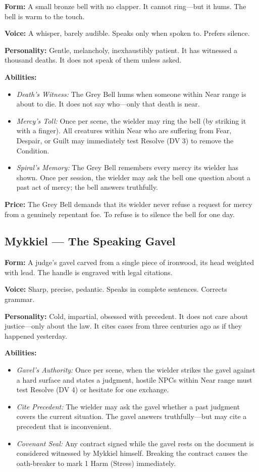 \noindent\textbf{Form:} A small bronze bell with no clapper. It cannot ring—but it hums. The bell is warm to the touch.

\noindent\textbf{Voice:} A whisper, barely audible. Speaks only when spoken to. Prefers silence.

\noindent\textbf{Personality:} Gentle, melancholy, inexhaustibly patient. It has witnessed a thousand deaths. It does not speak of them unless asked.

\noindent\textbf{Abilities:}
\begin{itemize}
\item \textit{Death's Witness:} The Grey Bell hums when someone within Near range is about to die. It does not say who—only that death is near.
\item \textit{Mercy's Toll:} Once per scene, the wielder may ring the bell (by striking it with a finger). All creatures within Near who are suffering from Fear, Despair, or Guilt may immediately test Resolve (DV 3) to remove the Condition.
\item \textit{Spiral's Memory:} The Grey Bell remembers every mercy its wielder has shown. Once per session, the wielder may ask the bell one question about a past act of mercy; the bell answers truthfully.
\end{itemize}

\noindent\textbf{Price:} The Grey Bell demands that its wielder never refuse a request for mercy from a genuinely repentant foe. To refuse is to silence the bell for one day.

\subsection{Mykkiel — The Speaking Gavel}

\noindent\textbf{Form:} A judge's gavel carved from a single piece of ironwood, its head weighted with lead. The handle is engraved with legal citations.

\noindent\textbf{Voice:} Sharp, precise, pedantic. Speaks in complete sentences. Corrects grammar.

\noindent\textbf{Personality:} Cold, impartial, obsessed with precedent. It does not care about justice—only about the law. It cites cases from three centuries ago as if they happened yesterday.

\noindent\textbf{Abilities:}
\begin{itemize}
\item \textit{Gavel's Authority:} Once per scene, when the wielder strikes the gavel against a hard surface and states a judgment, hostile NPCs within Near range must test Resolve (DV 4) or hesitate for one exchange.
\item \textit{Cite Precedent:} The wielder may ask the gavel whether a past judgment covers the current situation. The gavel answers truthfully—but may cite a precedent that is inconvenient.
\item \textit{Covenant Seal:} Any contract signed while the gavel rests on the document is considered witnessed by Mykkiel himself. Breaking the contract causes the oath-breaker to mark 1 Harm (Stress) immediately.
\end{itemize}

